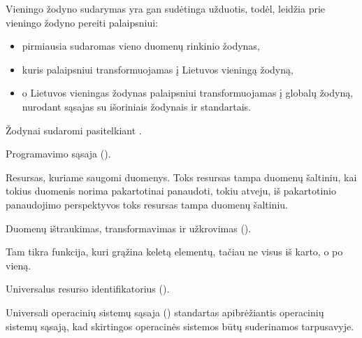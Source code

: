 \documentclass[letterpaper,10pt,lithuanian]{sphinxmanual}
\begin{document}
\begin{description}
\sphinxAtStartPar
Vieningo žodyno sudarymas yra gan sudėtinga užduotis, todėl, {\hyperref[\detokenize{savokos:term-DSA}]{}}
leidžia prie vieningo žodyno pereiti palaipsniui:
\begin{itemize}
\item {} 
\sphinxAtStartPar
pirmiausia sudaromas vieno duomenų rinkinio žodynas,

\item {} 
\sphinxAtStartPar
kuris palaipsniui transformuojamas į Lietuvos vieningą žodyną,

\item {} 
\sphinxAtStartPar
o Lietuvos vieningas žodynas palaipsniui transformuojamas į globalų
žodyną, nurodant sąsajas su išoriniais žodynais ir standartais.

\end{itemize}

\sphinxAtStartPar
Žodynai sudaromi pasitelkiant .

\sphinxAtStartPar
Programavimo sąsaja ().

\sphinxAtStartPar
Resursas, kuriame saugomi duomenys. Toks resursas tampa duomenų
šaltiniu, kai tokius duomenis norima pakartotinai panaudoti, tokiu
atveju, iš pakartotinio panaudojimo perspektyvos toks resursas tampa
duomenų šaltiniu.

\sphinxAtStartPar
Duomenų ištraukimas, transformavimas ir užkrovimas ().

\sphinxAtStartPar
Tam tikra funkcija, kuri grąžina keletą elementų, tačiau ne visus iš
karto, o po vieną.

\sphinxAtStartPar
Universalus resurso identifikatorius ().

\sphinxAtStartPar
Universali operacinių sistemų sąsaja () \sphinxhyphen{} standartas apibrėžiantis operacinių sistemų sąsają, kad
skirtingos operacinės sistemos būtų suderinamos tarpusavyje.


\end{description}
\end{document}
